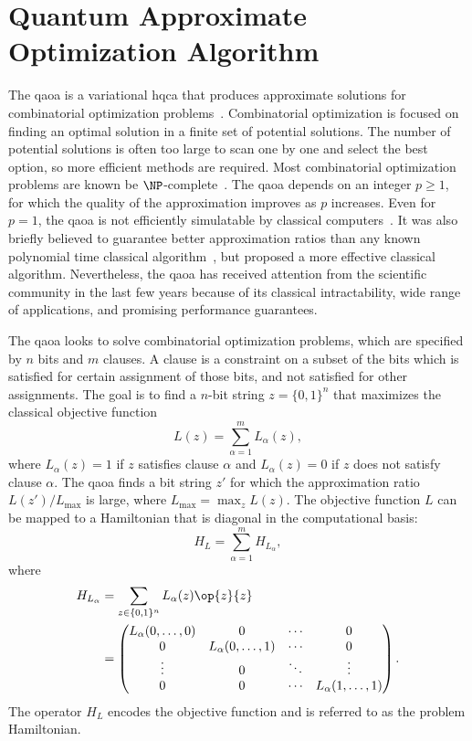 \section{Quantum Approximate Optimization Algorithm} \label{sec:qaoa}
The \acrfull{qaoa} is a variational \gls{hqca} that produces approximate solutions for combinatorial optimization problems~\cite{farhi2014quantum}.
Combinatorial optimization is focused on finding an optimal solution in a finite set of potential solutions.
The number of potential solutions is often too large to scan one by one and select the best option, so more efficient methods are required.
Most combinatorial optimization problems are known be $\NP$-complete~\cite{schrijver2003combinatorial}.
The \gls{qaoa} depends on an integer $p \ge 1$, for which the quality of the approximation improves as $p$ increases.
Even for $p = 1$, the \gls{qaoa} is not efficiently simulatable by classical computers~\cite{farhi2016quantum}.
It was also briefly believed to guarantee better approximation ratios than any known polynomial time classical algorithm~\cite{farhi2014quantum}, but \textcite{barak2015beating} proposed a more effective classical algorithm.
Nevertheless, the \gls{qaoa} has received attention from the scientific community in the last few years because of its classical intractability, wide range of applications, and promising performance guarantees.

The \gls{qaoa} looks to solve combinatorial optimization problems, which are specified by $n$ bits and $m$ clauses.
A clause is a constraint on a subset of the bits which is satisfied for certain assignment of those bits, and not satisfied for other assignments.
The goal is to find a $n$-bit string $z = \{0,1\}^n$ that maximizes the classical objective function
\begin{equation} \label{eqn:objective-function}
L(z) = \sum_{\alpha=1}^m L_\alpha(z),
\end{equation}
where $L_\alpha(z) = 1$ if $z$ satisfies clause $\alpha$ and $L_\alpha(z) = 0$ if $z$ does not satisfy clause $\alpha$.
The \gls{qaoa} finds a bit string $z'$ for which the approximation ratio $L(z')/L_{\text{max}}$ is large, where $L_{\text{max}} = \max_z L(z)$.
The objective function $L$ can be mapped to a Hamiltonian that is diagonal in the computational basis:
\begin{equation}
H_L = \sum_{\alpha=1}^m H_{L_\alpha},
\end{equation}
where
\begin{align}
H_{L_\alpha} &= \sum_{z \in \{0, 1\}^n} L_\alpha(z) \op{z}{z} \\
&=
\begin{pmatrix}
L_\alpha(0,\ldots,0) & 0 & \cdots & 0 \\
0 & L_\alpha(0,\ldots,1) & \cdots & 0 \\
\vdots & 0 & \ddots & \vdots \\
0 & 0 & \cdots & L_\alpha(1,\ldots,1)
\end{pmatrix}.
\end{align}
The operator $H_L$ encodes the objective function and is referred to as the problem Hamiltonian.

